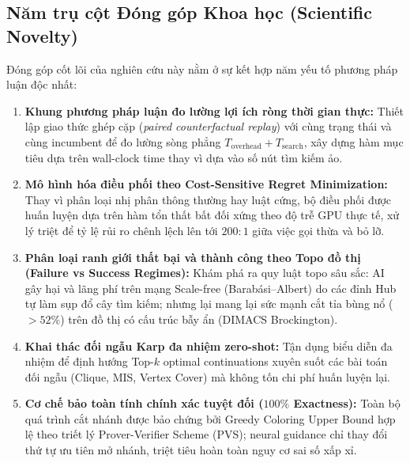 \documentclass[11pt,a4paper]{article}
\begin{document}
\subsection{Năm trụ cột Đóng góp Khoa học (Scientific Novelty)}
Đóng góp cốt lõi của nghiên cứu này nằm ở sự kết hợp năm yếu tố phương pháp luận độc nhất:
\begin{enumerate}[leftmargin=*]
    \item \textbf{Khung phương pháp luận đo lường lợi ích ròng thời gian thực:} Thiết lập giao thức ghép cặp (\textit{paired counterfactual replay}) với cùng trạng thái và cùng incumbent để đo lường sòng phẳng $T_{\mathrm{overhead}} + T_{\mathrm{search}}$, xây dựng hàm mục tiêu dựa trên wall-clock time thay vì dựa vào số nút tìm kiếm ảo.
    \item \textbf{Mô hình hóa điều phối theo Cost-Sensitive Regret Minimization:} Thay vì phân loại nhị phân thông thường hay luật cứng, bộ điều phối được huấn luyện dựa trên hàm tổn thất bất đối xứng theo độ trễ GPU thực tế, xử lý triệt để tỷ lệ rủi ro chênh lệch lên tới $200:1$ giữa việc gọi thừa và bỏ lỡ.
    \item \textbf{Phân loại ranh giới thất bại và thành công theo Topo đồ thị (Failure vs Success Regimes):} Khám phá ra quy luật topo sâu sắc: AI gây hại và lãng phí trên mạng Scale-free (Barab\'asi--Albert) do các đỉnh Hub tự làm sụp đổ cây tìm kiếm; nhưng lại mang lại sức mạnh cắt tỉa bùng nổ ($>52\%$) trên đồ thị có cấu trúc bẫy ẩn (DIMACS Brockington).
    \item \textbf{Khai thác đối ngẫu Karp đa nhiệm zero-shot:} Tận dụng biểu diễn đa nhiệm để định hướng Top-$k$ optimal continuations xuyên suốt các bài toán đối ngẫu (Clique, MIS, Vertex Cover) mà không tốn chi phí huấn luyện lại.
    \item \textbf{Cơ chế bảo toàn tính chính xác tuyệt đối ($100\%$ Exactness):} Toàn bộ quá trình cắt nhánh được bảo chứng bởi Greedy Coloring Upper Bound hợp lệ theo triết lý Prover-Verifier Scheme (PVS); neural guidance chỉ thay đổi thứ tự ưu tiên mở nhánh, triệt tiêu hoàn toàn nguy cơ sai số xấp xỉ.
\end{enumerate}
\end{document}
